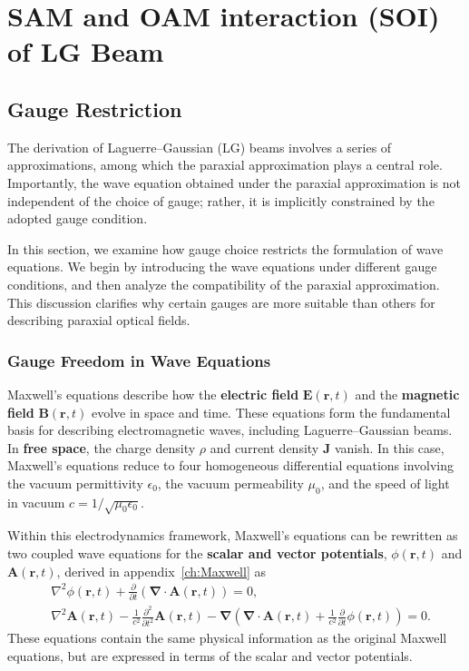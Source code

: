 \chapter{SAM and OAM interaction (SOI) of LG Beam}
\label{ch:Theory}
\section{Gauge Restriction}

The derivation of Laguerre--Gaussian (LG) beams involves a series of approximations, among which the paraxial approximation plays a central role. Importantly, the wave equation obtained under the paraxial approximation is not independent of the choice of gauge; rather, it is implicitly constrained by the adopted gauge condition.

In this section, we examine how gauge choice restricts the formulation of wave equations. We begin by introducing the wave equations under different gauge conditions, and then analyze the compatibility of the paraxial approximation. This discussion clarifies why certain gauges are more suitable than others for describing paraxial optical fields.

\subsection{Gauge Freedom in Wave Equations}

Maxwell's equations describe how the \textbf{electric field} $\boldsymbol{E}(\boldsymbol{r}, t)$ and the \textbf{magnetic field} $\boldsymbol{B}(\boldsymbol{r}, t)$ evolve in space and time. These equations form the fundamental basis for describing electromagnetic waves, including Laguerre--Gaussian beams. In \textbf{free space}, the charge density $\rho$ and current density $\mathbf{J}$ vanish. In this case, Maxwell's equations reduce to four homogeneous differential equations involving the vacuum permittivity $\epsilon_0$, the vacuum permeability $\mu_0$, and the speed of light in vacuum $c=1/\sqrt{\mu_0\epsilon_0}$. 

Within this electrodynamics framework, Maxwell's equations can be rewritten as two coupled wave equations for the \textbf{scalar and vector potentials}, $\phi(\boldsymbol{r}, t)$ and $\boldsymbol{A}(\boldsymbol{r}, t)$, derived in appendix~\ref{ch:Maxwell} as
\begin{align} 
&\nabla^2\phi(\boldsymbol{r}, t)+\frac{\partial }{\partial t}\left(\boldsymbol{\nabla}\cdot\boldsymbol{A}(\boldsymbol{r}, t)\right)=0, \label{max5} \\
&\nabla^2\boldsymbol{A}(\boldsymbol{r}, t)-\frac{1}{c^2}\frac{\partial^2 }{\partial t^2}\boldsymbol{A}(\boldsymbol{r}, t)-\boldsymbol{\nabla}\left(\boldsymbol{\nabla}\cdot\boldsymbol{A}(\boldsymbol{r}, t)+\frac{1}{c^2}\frac{\partial }{\partial t}\phi(\boldsymbol{r}, t)\right)=0. \label{max6}
\end{align}
These equations contain the same physical information as the original Maxwell equations, but are expressed in terms of the scalar and vector potentials.

